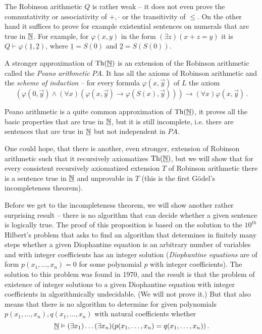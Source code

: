 The Robinson arithmetic $Q$ is rather weak -- it does not even prove the commutativity or associativity of $+,\cdot$ or the transitivity of $\leq$. On the other hand it suffices to prove for example existential sentences on numerals that are true in $\underline{\mathbb{N}}$. For example, for $\varphi(x,y)$ in the form $(\exists z)(x+z=y)$ it is $Q \vdash \varphi(\underline{1}, \underline{2})$, where $\underline{1} = S(0)$ and $\underline{2} = S(S(0))$.

A stronger approximation of $\operatorname{Th}(\underline{\mathbb{N}})$ is an extension of the Robinson arithmetic called the \emph{Peano arithmetic} $PA$. It has all the axioms of Robinson arithmetic and the \emph{scheme of induction} -- for every formula $\varphi(x, \vec{y})$ of $L$ the axiom $$(\varphi(0, \vec{y}) \land (\forall x)(\varphi(x, \vec{y}) \to \varphi(S(x), \vec{y}))) \to (\forall x)\varphi(x, \vec{y})\,.$$

Peano arithmetic is a quite common approximation of $\operatorname{Th}(\underline{\mathbb{N}})$, it proves all the basic properties that are true in $\underline{\mathbb{N}}$, but it is still incomplete, i.e. there are sentences that are true in $\underline{\mathbb{N}}$ but not independent in $PA$. 

One could hope, that there is another, even stronger, extension of Robinson arithmetic such that it recursively axiomatizes $\operatorname{Th}(\underline{\mathbb{N}})$, but we will show that for every consistent recursively axiomatized extension $T$ of Robinson arithmetic there is a sentence true in $\underline{\mathbb{N}}$ and unprovable in $T$ (this is the first Gödel's incompleteness theorem).

Before we get to the incompleteness theorem, we will show another rather surprising result -- there is no algorithm that can decide whether a given sentence is logically true. The proof of this proposition is based on the solution to the $10^{th}$ Hilbert's problem that asks to find an algorithm that determines in finitely many steps whether a given Diophantine equation is an arbitrary number of variables and with integer coefficients has an integer solution (\emph{Diophantine equations} are of form $p(x_1, \dots, x_n) = 0$ for some polynomial $p$ with integer coefficients). The solution to this problem was found in 1970, and the result is that the problem of existence of integer solutions to a given Diophantine equation with integer coefficients in algorithmically undecidable. (We will not prove it.) But that also means that there is no algorithm to determine for given polynomials $p(x_1, \dots, x_n), q(x_1, \dots, x_n)$ with natural coefficients whether $$\underline{\mathbb{N}} \vDash (\exists x_1)\dots(\exists x_n)(p(x_1, \dots, x_n) = q(x_1, \dots, x_n))\,.$$

